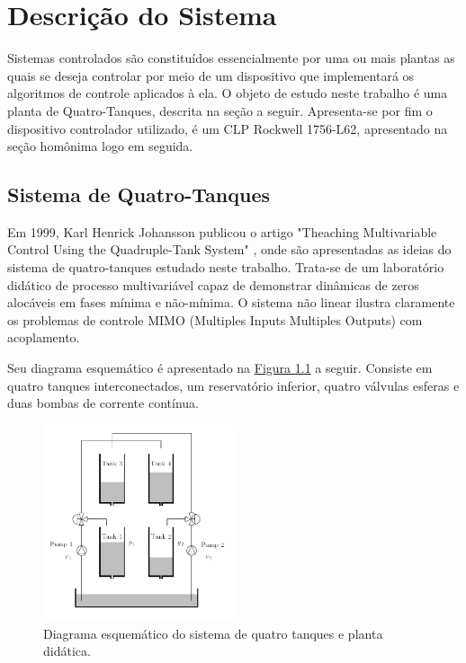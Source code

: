%

\chapter{Descrição do Sistema} \label{capDescSis}
Sistemas controlados são constituídos essencialmente por uma ou mais plantas as quais se deseja controlar por meio de  um dispositivo que implementará os algoritmos de controle aplicados à ela. O objeto de estudo neste trabalho é uma planta de Quatro-Tanques, descrita na seção a seguir. Apresenta-se por fim o dispositivo controlador utilizado, é um CLP Rockwell 1756-L62, apresentado na seção homônima logo em seguida.

\section{Sistema de Quatro-Tanques}
Em 1999, Karl Henrick Johansson publicou o artigo "Theaching Multivariable Control Using the Quadruple-Tank System" \cite{johansson2}, onde são apresentadas as ideias do sistema de quatro-tanques estudado neste trabalho. Trata-se de um laboratório didático de processo multivariável capaz de demonstrar dinâmicas de zeros alocáveis em fases mínima e não-mínima. O sistema não linear ilustra claramente os problemas de controle MIMO (Multiples Inputs Multiples Outputs) com acoplamento.

Seu diagrama esquemático é apresentado na  \hyperref[figDesc4tank]{Figura \ref{figDesc4tank}} a seguir. Consiste em quatro tanques interconectados, um reservatório inferior, quatro válvulas esferas e duas bombas de corrente contínua.

\begin{figure}[H]
	\centering
	\includegraphics[width=0.5\textwidth]{img/4tank.png}
	\caption{\label{figDesc4tank}Diagrama esquemático do sistema de quatro tanques e planta didática.}
\end{figure}


